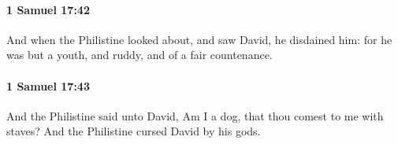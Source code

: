 		\paragraph{1 Samuel 17:42} %
			\label{1SAMUEL-17-42}

			And when the Philistine looked about, and saw David, he disdained him: for he was but a youth, and ruddy, and of a fair countenance.


		\paragraph{1 Samuel 17:43} %
			\label{1SAMUEL-17-43}

			And the Philistine said unto David, Am I a dog, that thou comest to me with staves? And the Philistine cursed David by his gods.


